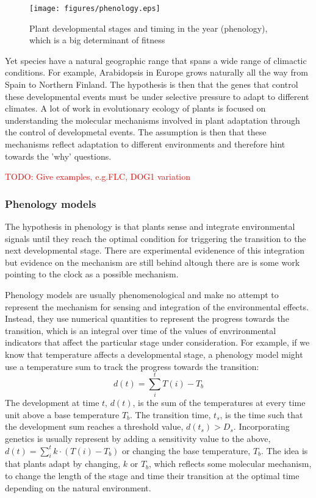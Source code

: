 \documentclass[phd]{infthesis}
\newcommand{\eg}{e.g.\xspace}
\newcommand{\todo}[1]{\textcolor{red}{TODO: #1}}
\begin{document}
\begin{figure}[tb]
\centering
\texttt{[image: figures/phenology.eps]}
  \caption{Plant developmental stages and timing in the year (phenology), which
    is a big determinant of fitness}
\label{fig:plantLife}
\end{figure}

Yet species have a natural geographic range that spans a wide range of climactic
conditions. For example, Arabidopsis in Europe grows naturally all the way from
Spain to Northern Finland. The hypothesis is then that the genes that control
these developmental events must be under selective pressure to adapt to
different climates. A lot of work in evolutionary ecology of plants is focused
on understanding the molecular mechanisms involved in plant adaptation through
the control of developmetal events. The assumption is then that these mechanisms
reflect adaptation to different environments and therefore hint towards the
'why' questions.

\todo{Give examples, \eg{FLC, DOG1 variation}}


\subsubsection*{Phenology models}
The hypothesis in phenology is that plants sense and integrate environmental
signals until they reach the optimal condition for triggering the transition to
the next developmental stage. There are experimental evidenence of this
integration but evidence on the mechanism are still behind altough there are is
some work pointing to the clock as a possible mechanism.

Phenology models are usually phenomenological and make no attempt to represent
the mechanism for sensing and integration of the environmental effects. Instead,
they use numerical quantities to represent the progress towards the transition,
which is an integral over time of the values of envrironmental indicators that
affect the particular stage under consideration. For example, if we know that
temperature affects a developmental stage, a phenology model might use a
temperature sum to track the progress towards the transition:
$$
d(t) = \sum_{i}^{t} T(i) - T_b
$$
The development at time $t$, $d(t)$, is the sum of the temperatures at every
time unit above a base temperature $T_b$. The transition time, $t_s$, is the
time such that the development sum reaches a threshold value, $d(t_s) >
D_s$. Incorporating genetics is usually represent by adding a sensitivity value
to the above, $ d(t) = \sum_{i}^{t} k \cdot (T(i) - T_b)$ or changing the base temperature,
$T_b$. The idea is that plants adapt by changing, $k$ or $T_b$, which reflects
some molecular mechanism, to change the length of the stage and time their
transition at the optimal time depending on the natural environment.
\end{document}
